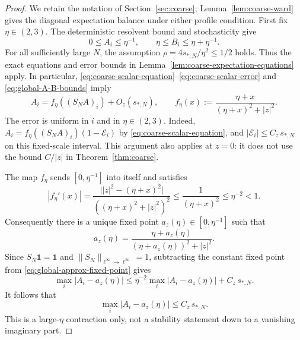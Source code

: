 \documentclass[11pt,reqno]{amsart}
\numberwithin{equation}{section}
\theoremstyle{plain}
\theoremstyle{definition}
\theoremstyle{remark}
\begin{document}
\begin{proof}
We retain the notation of Section~\ref{sec:coarse};
Lemma~\ref{lem:coarse-ward} gives the diagonal expectation balance under
either profile condition.  First fix
$\eta\in(2,3)$.  The deterministic resolvent bound and stochasticity give
\begin{equation}\label{eq:global-A-B-bounds}
 0\le A_i\le\eta^{-1},\qquad
 \eta\le B_i\le\eta+\eta^{-1}.
\end{equation}
For all sufficiently large $N$, the assumption
$\rho=4s_{*,N}/\eta^2\le1/2$ holds.  Thus the exact equations and error
bounds in Lemma~\ref{lem:coarse-expectation-equations} apply.  In
particular, \eqref{eq:coarse-scalar-equation}--\eqref{eq:coarse-scalar-error}
and \eqref{eq:global-A-B-bounds} imply
\begin{equation}\label{eq:global-approx-fixed-point}
 A_i=f_\eta((S_NA)_i)+O_z(s_{*,N}),\qquad
 f_\eta(x):=\frac{\eta+x}{(\eta+x)^2+|z|^2}.
\end{equation}
The error is uniform in $i$ and in $\eta\in(2,3)$.  Indeed,
$A_i=f_\eta((S_NA)_i)(1-\mathcal E_i)$ by
\eqref{eq:coarse-scalar-equation}, and
$|\mathcal E_i|\le C_z\,s_{*,N}$ on this fixed-scale interval.  This
argument also applies at $z=0$: it does not use the bound $C/|z|$ in
Theorem~\ref{thm:coarse}.

The map $f_\eta$ sends $[0,\eta^{-1}]$ into itself and satisfies
\[
 |f_\eta'(x)|
 =\frac{\bigl||z|^2-(\eta+x)^2\bigr|}
        {((\eta+x)^2+|z|^2)^2}
 \le\frac1{(\eta+x)^2}\le\eta^{-2}<1.
\]
Consequently there is a unique fixed point
$a_z(\eta)\in[0,\eta^{-1}]$ such that
\begin{equation}\label{eq:global-scalar-fixed-point}
 a_z(\eta)=\frac{\eta+a_z(\eta)}
 {(\eta+a_z(\eta))^2+|z|^2}.
\end{equation}
Since $S_N\mathbf1=\mathbf1$ and
$\|S_N\|_{\ell^\infty\to\ell^\infty}=1$, subtracting the constant fixed
point from \eqref{eq:global-approx-fixed-point} gives
\[
 \max_i|A_i-a_z(\eta)|
 \le\eta^{-2}\max_i|A_i-a_z(\eta)|+C_z\,s_{*,N}.
\]
It follows that
\begin{equation}\label{eq:global-mean-convergence}
 \max_i|A_i-a_z(\eta)|\le C_z\,s_{*,N}.
\end{equation}
This is a large-$\eta$ contraction only, not a stability statement down to
a vanishing imaginary part.


\end{proof}
\end{document}
